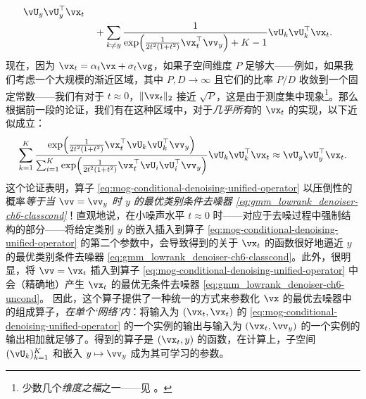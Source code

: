 \documentclass[../../book-main_zh.tex]{subfiles}
\begin{document}
\begin{example}
\begin{align}
\begin{split}
{    }
    \vU_{y}\vU_{y}^{\top}\vx_t
    \\
    &\quad+
    \sum_{k \neq y}
    \frac{
      1
    }
    {
      \exp\rp{\frac{1}{2t^{2}(1
      + t^{2})}\vx_t^\top \vv_y}
      + K-1
    }
    \vU_{k}\vU_{k}^{\top}\vx_t.
    \end{split}
  \end{align}
  现在，因为 $\vx_t = \alpha_t \vx + \sigma_t \vg$，如果子空间维度 $P$ 足够大——例如，如果我们考虑一个大规模的渐近区域，其中 $P, D \to \infty$ 且它们的比率 $P/D$ 收敛到一个固定常数——我们有对于 $t \approx 0$，$\norm{\vx_t}_2$ 接近 $\sqrt{P}$，这是由于测度集中现象\footnote{少数几个\textit{维度之福}之一——见 \textcite{Wright-Ma-2022}。}。那么
  根据前一段的论证，我们有在这种区域中，对于\textit{几乎所有}的 $\vx_t$ 的实现，以下近似成立：
  \begin{equation}
    \sum_{k = 1}^{K}
    \frac{
      \exp\rp{\frac{1}{2t^{2}(1
      + t^{2})}\vx_t^\top \vU_k \vU_k^\top \vv_y}
    }
    {
      \sum_{i
      = 1}^{K}\exp\rp{\frac{1}{2t^{2}(1
      + t^{2})}\vx_t^\top \vU_i \vU_i^\top \vv_y}
    }
    \vU_{k}\vU_{k}^{\top}\vx_t
    \approx
    \vU_{y}\vU_{y}^{\top}\vx_t.
  \end{equation}
  这个论证表明，算子 \eqref{eq:mog-conditional-denoising-unified-operator} 以压倒性的概率\textit{等于当 $\vv = \vv_y$ 时 $y$ 的最优类别条件去噪器 \eqref{eq:gmm_lowrank_denoiser-ch6-classcond}}！直观地说，在小噪声水平 $t \approx 0$ 时——对应于去噪过程中强制结构的部分——将给定类别 $y$ 的嵌入插入到算子 \eqref{eq:mog-conditional-denoising-unified-operator} 的第二个参数中，会导致得到的关于 $\vx_t$ 的函数很好地逼近 $y$ 的最优类别条件去噪器 \eqref{eq:gmm_lowrank_denoiser-ch6-classcond}。此外，很明显，将 $\vv = \vx_t$ 插入到算子 \eqref{eq:mog-conditional-denoising-unified-operator} 中会（精确地）产生 $\vx_t$ 的最优无条件去噪器 \eqref{eq:gmm_lowrank_denoiser-ch6-uncond}。
  因此，这个算子提供了一种统一的方式来参数化 $\vx$ 的最优去噪器中的组成算子，\textit{在单个‘网络’内}：将输入为 $(\vx_t, \vx_t)$ 的 \eqref{eq:mog-conditional-denoising-unified-operator} 的一个实例的输出与输入为 $(\vx_t, \vv_y)$ 的一个实例的输出相加就足够了。得到的算子是 $(\vx_t, y)$ 的函数，在计算上，子空间 $(\vU_k)_{k=1}^K$ 和嵌入 $y \mapsto \vv_y$ 成为其可学习的参数。
\end{example}
\end{document}
